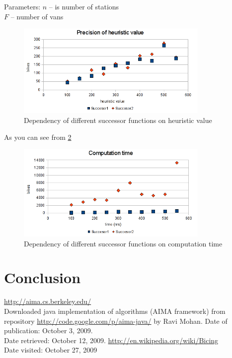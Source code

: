 \documentclass[11pt,twoside,a4paper]{mr}%
\begin{document}
\begin{tabbing}
Parameters:     \= \(n\) -- is number of stations\\
	\> \(F\) -- number of vans
 \end{tabbing}


\begin{figure}[ht]
\begin{center}
\includegraphics[width=350px]{images/s1-s2-h.png}
\caption{Dependency of different successor functions on heuristic value}
\label{sa:succ-time}
\end{center}
\end{figure}

As you can see from \ref{sa:succ-time}
\begin{figure}[ht]
\begin{center}
\includegraphics[width=350px]{images/s1-s2-time.png}
\caption{Dependency of different successor functions on computation time }
\label{sa:succ-time}
\end{center}
\end{figure}





\chapter{Conclusion}

\clearpage
\begin{thebibliography}{9}
		\url{http://aima.cs.berkeley.edu/} \\
		{Downloaded java implementation of algorithms (AIMA framework) from repository \url{http://code.google.com/p/aima-java/} by Ravi Mohan. Date of publication: October 3, 2009. \\
		Date retrieved: October 12, 2009. }
\url{http://en.wikipedia.org/wiki/Bicing}\\
{Date visited: October 27, 2009}


\end{thebibliography}
\end{document}
